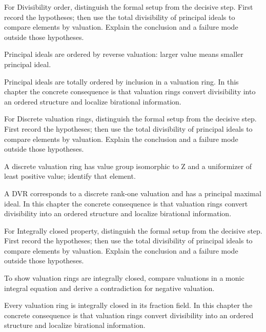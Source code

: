 \begin{exercise}\label{exr:v21-04}
For Divisibility order, distinguish the formal setup from the decisive step. First record the hypotheses; then use the total divisibility of principal ideals to compare elements by valuation. Explain the conclusion and a failure mode outside those hypotheses.
\end{exercise}
\begin{hint}
Principal ideals are ordered by reverse valuation: larger value means smaller principal ideal.
\end{hint}
\begin{solution}
Principal ideals are totally ordered by inclusion in a valuation ring. In this chapter the concrete consequence is that valuation rings convert divisibility into an ordered structure and localize birational information.
\end{solution}

\begin{exercise}\label{exr:v21-05}
For Discrete valuation rings, distinguish the formal setup from the decisive step. First record the hypotheses; then use the total divisibility of principal ideals to compare elements by valuation. Explain the conclusion and a failure mode outside those hypotheses.
\end{exercise}
\begin{hint}
A discrete valuation ring has value group isomorphic to Z and a uniformizer of least positive value; identify that element.
\end{hint}
\begin{solution}
A DVR corresponds to a discrete rank-one valuation and has a principal maximal ideal. In this chapter the concrete consequence is that valuation rings convert divisibility into an ordered structure and localize birational information.
\end{solution}

\begin{exercise}\label{exr:v21-06}
For Integrally closed property, distinguish the formal setup from the decisive step. First record the hypotheses; then use the total divisibility of principal ideals to compare elements by valuation. Explain the conclusion and a failure mode outside those hypotheses.
\end{exercise}
\begin{hint}
To show valuation rings are integrally closed, compare valuations in a monic integral equation and derive a contradiction for negative valuation.
\end{hint}
\begin{solution}
Every valuation ring is integrally closed in its fraction field. In this chapter the concrete consequence is that valuation rings convert divisibility into an ordered structure and localize birational information.
\end{solution}

